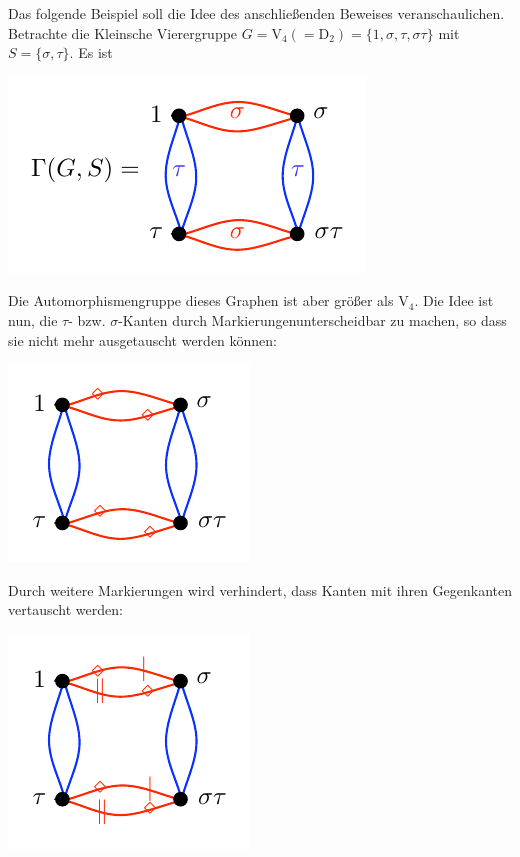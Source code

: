 \documentclass[a4paper, 12pt, twoside]{article}
\begin{document}
Das folgende Beispiel soll die Idee des anschließenden Beweises
veranschaulichen.
\BSP Betrachte die Kleinsche Vierergruppe
$G=\mathrm{V}_4(=\mathrm{D}_2)=\{1,\sigma,\tau,\sigma\tau\}$
mit $S=\{\sigma,\tau\}$.
Es ist
\begin{center}
	\includegraphics{grugraImages/klein41}
\end{center}
Die Automorphismengruppe dieses Graphen ist aber größer als
$\mathrm{V}_4$. Die Idee ist nun, die $\tau$- bzw. $\sigma$-Kanten
durch \glqq Markierungen\grqq unterscheidbar zu machen,
so dass sie nicht mehr ausgetauscht werden können:
\begin{center}
	\includegraphics{grugraImages/klein42}
\end{center}
Durch weitere Markierungen wird verhindert, dass Kanten mit ihren
Gegenkanten vertauscht werden:
\begin{center}
	\includegraphics{grugraImages/klein43}
\end{center}
\end{document}
